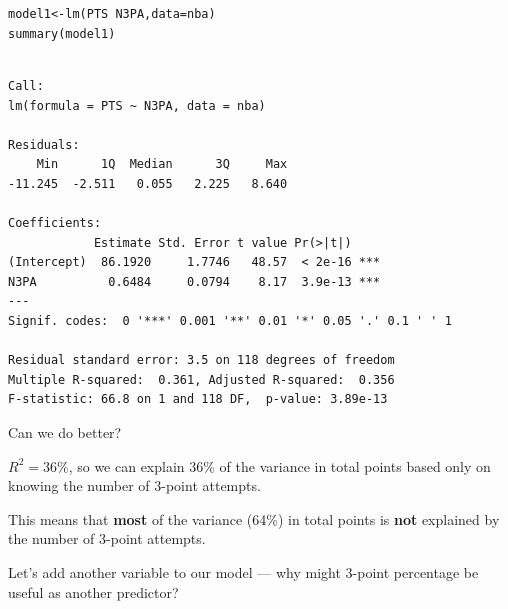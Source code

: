 \documentclass{beamer}\usepackage[]{graphicx}\usepackage[]{color}
\makeatletter
\newcommand{\hlopt}[1]{\textcolor[rgb]{1,0.894,0.769}{#1}}%
\newcommand{\hlstd}[1]{\textcolor[rgb]{1,0.894,0.769}{#1}}%
\newcommand{\hlkwb}[1]{\textcolor[rgb]{0.804,0.776,0.451}{#1}}%
\newcommand{\hlkwc}[1]{\textcolor[rgb]{0.78,0.941,0.545}{#1}}%
\newcommand{\hlkwd}[1]{\textcolor[rgb]{1,0.78,0.769}{#1}}%
\newenvironment{kframe}{%
 \def\at@end@of@kframe{}%
 \ifinner\ifhmode%
  \def\at@end@of@kframe{\end{minipage}}%
  \begin{minipage}{\columnwidth}%
 \fi\fi%
 \def\FrameCommand##1{\hskip\@totalleftmargin \hskip-\fboxsep
 \colorbox{shadecolor}{##1}\hskip-\fboxsep
     \hskip-\linewidth \hskip-\@totalleftmargin \hskip\columnwidth}%
 \MakeFramed {\advance\hsize-\width
   \@totalleftmargin\z@ \linewidth\hsize
   \@setminipage}}%
 {\par\unskip\endMakeFramed%
 \at@end@of@kframe}
\newenvironment{knitrout}{}{} %
\makeatother
\begin{document}
\begin{darkframes}
\begin{frame}[fragile]
\begin{knitrout}
\end{knitrout}

    \end{frame}

    \begin{frame}[fragile]
      \fontsize{8}{8}\selectfont
\begin{knitrout}
\color{fgcolor}\begin{kframe}
\begin{alltt}
\hlstd{model1} \hlkwb{<-} \hlkwd{lm}\hlstd{(PTS} \hlopt{~} \hlstd{N3PA,} \hlkwc{data}\hlstd{=nba)}
\hlkwd{summary}\hlstd{(model1)}
\end{alltt}
\begin{verbatim}

Call:
lm(formula = PTS ~ N3PA, data = nba)

Residuals:
    Min      1Q  Median      3Q     Max 
-11.245  -2.511   0.055   2.225   8.640 

Coefficients:
            Estimate Std. Error t value Pr(>|t|)    
(Intercept)  86.1920     1.7746   48.57  < 2e-16 ***
N3PA          0.6484     0.0794    8.17  3.9e-13 ***
---
Signif. codes:  0 '***' 0.001 '**' 0.01 '*' 0.05 '.' 0.1 ' ' 1

Residual standard error: 3.5 on 118 degrees of freedom
Multiple R-squared:  0.361,	Adjusted R-squared:  0.356 
F-statistic: 66.8 on 1 and 118 DF,  p-value: 3.89e-13
\end{verbatim}
\end{kframe}
\end{knitrout}

    \end{frame}

    \begin{frame}{Can we do better?}
      \begin{center}
        $R^2=36\%$, so we can explain
        36\% of the variance in total points based only on
        knowing the number of 3-point attempts.

        \pause\bigskip

        This means that \textbf{most} of the variance (64\%) in total points is \textbf{not} explained by the number of 3-point attempts.

        \pause\bigskip

        Let's add another variable to our model --- why might 3-point percentage be useful as another predictor?
      \end{center}


\end{frame}
\end{darkframes}
\end{document}
